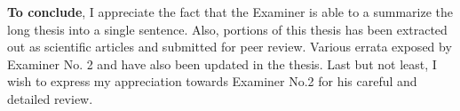 
\textbf{To conclude}, I appreciate the fact that the Examiner is able to a summarize the long thesis into a single sentence.
Also, portions of this thesis has been extracted out as scientific articles and submitted for peer review.
Various errata exposed by Examiner No. 2 and have also been updated in the thesis.
Last but not least, I wish to express my appreciation towards Examiner No.2 for his careful and detailed review.

%



